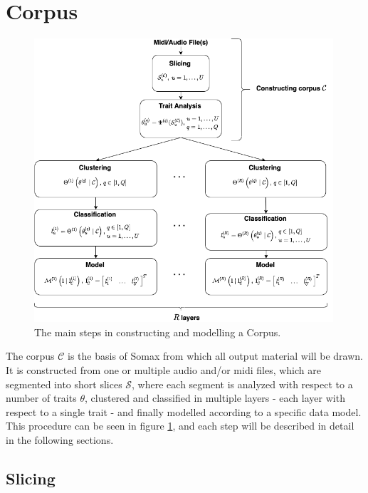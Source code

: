 \section{Corpus}\label{sec:3-corpus}
 \begin{figure}[h!]
    \centering        
 	\includegraphics[width=0.99\textwidth]{figures/3-somax-corpus.png}
    \caption{The main steps in constructing and modelling a Corpus.}
    \label{fig:3-somax-corpus}
\end{figure}

\noindent The corpus $\mathcal C$ is the basis of Somax from which all output material will be drawn. It is constructed from one or multiple audio and/or midi files, which are segmented into short slices $\mathcal{S}$, where each segment is analyzed with respect to a number of traits $\theta$, clustered and classified in multiple layers - each layer with respect to a single trait -  and finally modelled according to a specific data model. This procedure can be seen in figure \ref{fig:3-somax-corpus}, and each step will be described in detail in the following sections.

\subsection{Slicing}\label{sec:3-corpus-slicing}

